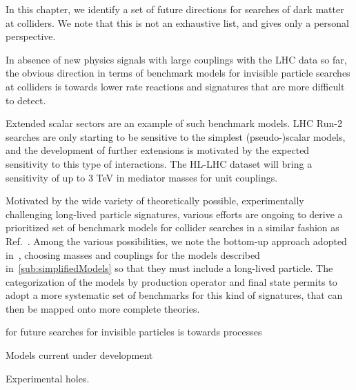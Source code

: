 In this chapter, we identify a set of future directions for searches of dark matter at colliders. 
We note that this is not an exhaustive list, and gives only a personal perspective. 



In absence of new physics signals with large couplings with the LHC data so far, the obvious direction 
in terms of benchmark models for invisible particle searches at colliders is towards lower rate reactions
and signatures that are more difficult to detect. 

Extended scalar sectors are an example of such benchmark models. LHC Run-2 searches are only starting to be sensitive to the simplest (pseudo-)scalar models, and the development of further extensions is motivated by the expected sensitivity to this type of interactions. The HL-LHC dataset will bring a sensitivity of up to 3 TeV in mediator masses for unit couplings. 

Motivated by the wide variety of theoretically possible, experimentally challenging long-lived particle signatures, various efforts are ongoing to derive a prioritized set of benchmark models for collider searches in a similar fashion as Ref.~\cite{Abercrombie:2015wmb}. 
Among the various possibilities, we note the bottom-up approach adopted in~\cite{Buchmueller:2017uqu}, choosing masses and couplings for the models described in~\ref{sub:simplifiedModels} so that they must include a long-lived particle. 
The categorization of the models by production operator and final state permits to adopt a more systematic set of benchmarks for this kind of signatures, that can then be mapped onto more complete theories. 



for future searches for invisible particles is towards processes 

Models current under development 

Experimental holes. 

